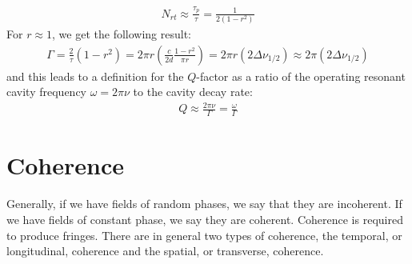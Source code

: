 \documentclass[11pt]{book}
\theoremstyle{break}
\theoremstyle{break}
\begin{document}
\begin{align*}
N_{rt} \approx \frac{\tau_p}{\tau} = \frac{1}{2(1-r^2)}
\end{align*}
For $r \approx 1$, we get the following result:
\begin{align*}
\Gamma = \frac{2}{\tau}(1-r^2) = 2\pi r\left( \frac{c}{2d} \frac{1-r^2}{\pi r}\right) = 2\pi r(2\Delta \nu_{1/2}) \approx 2\pi (2\Delta \nu_{1/2})
\end{align*}
and this leads to a definition for the $Q$-factor as a ratio of the operating resonant cavity frequency $\omega = 2\pi \nu$ to the cavity decay rate:
\begin{align*}
Q \approx \frac{2\pi \nu}{\Gamma} = \frac{\omega}{\Gamma}
\end{align*}



\newpage
\chapter{Coherence}
Generally, if we have fields of random phases, we say that they are incoherent. If we have fields of constant phase, we say they are coherent. Coherence is required to produce fringes. There are in general two types of coherence, the temporal, or longitudinal, coherence and the spatial, or transverse, coherence. \\
\end{document}
